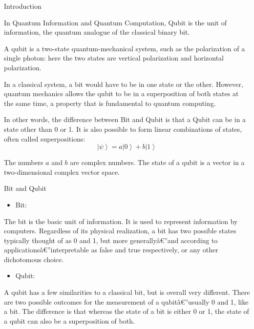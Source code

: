 \documentclass[beamer,serif]{beamer}
\begin{document}
\begin{frame}{Introduction}{}
	\par In Quantum Information and Quantum Computation, Qubit is the unit of information, the quantum analogue of the classical binary bit.
	\par A qubit is a two-state quantum-mechanical system, such as the polarization of a single photon: here the two states are vertical polarization and horizontal polarization.
	\par In a classical system, a bit would have to be in one state or the other. However, quantum mechanics allows the qubit to be in a superposition of both states at the same time, a property that is fundamental to quantum computing.
	\par In other words, the difference between Bit and Qubit is that a Qubit can be in a state other than 0 or 1. It is also possible to form linear combinations of states, often called superpositions:
	\begin{equation}
		\left| \psi \right\rangle = a\left| 0 \right\rangle+b\left| 1 \right\rangle
	\end {equation}
	\par \setlength{\parindent}{1em} The numbers $a$ and $b$ are complex numbers. The state of a qubit is a vector in a two-dimensional complex vector space.
\end{frame}

\begin{frame}{Bit and Qubit}{}
	\begin{itemize}
	\item Bit:
	\end{itemize}
	\par The bit is the basic unit of information. It is used to represent information by computers. Regardless of its physical realization, a bit has two possible states typically thought of as 0 and 1, but more generallyâ€”and according to applicationsâ€”interpretable as false and true respectively, or any other dichotomous choice.
	\begin{itemize}
	\item Qubit:
	\end{itemize}
	\par A qubit has a few similarities to a classical bit, but is overall very different. There are two possible outcomes for the measurement of a qubitâ€”usually 0 and 1, like a bit. The difference is that whereas the state of a bit is either 0 or 1, the state of a qubit can also be a superposition of both.
\end{frame}
\end{document}
